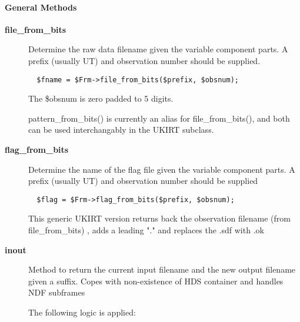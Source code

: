 \paragraph*{General Methods\label{ORAC::Frame::UKIRT_General_Methods}}
\begin{description}

\item[{\textbf{file\_from\_bits}}] \mbox{}

Determine the raw data filename given the variable component
parts. A prefix (usually UT) and observation number should
be supplied.

\begin{verbatim}
  $fname = $Frm->file_from_bits($prefix, $obsnum);
\end{verbatim}


The \$obsnum is zero padded to 5 digits.



pattern\_from\_bits() is currently an alias for file\_from\_bits(),
and both can be used interchangably in the UKIRT subclass.


\item[{\textbf{flag\_from\_bits}}] \mbox{}

Determine the name of the flag file given the variable
component parts. A prefix (usually UT) and observation number
should be supplied

\begin{verbatim}
  $flag = $Frm->flag_from_bits($prefix, $obsnum);
\end{verbatim}


This generic UKIRT version returns back the observation filename (from
file\_from\_bits) , adds a leading "." and replaces the .sdf with .ok


\item[{\textbf{inout}}] \mbox{}

Method to return the current input filename and the new output
filename given a suffix.  Copes with non-existence of HDS container
and handles NDF subframes



The following logic is applied:


\end{description}
